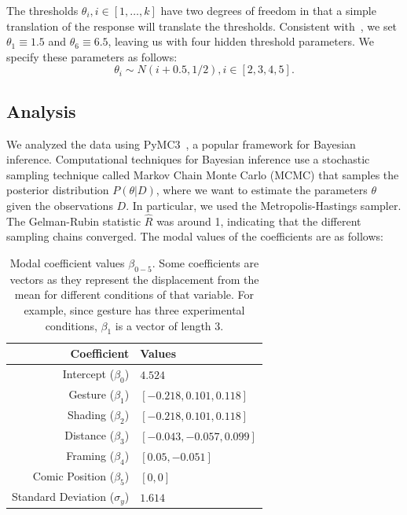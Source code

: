 The thresholds $\theta_i, i \in [1, \ldots, k]$ have two degrees of freedom in that a simple translation of the response will translate the thresholds. Consistent with~\textcite[][p. 674]{Kruschke2014}, we set $\theta_1\equiv1.5$ and $\theta_6\equiv6.5$, leaving us with four hidden threshold parameters. We specify these parameters as follows:
\begin{equation}
 \theta_i \sim N(i+0.5, 1/2), i \in [2, 3, 4, 5].
\end{equation}

\subsection{Analysis}
\label{sub:Analysis}

We analyzed the data using PyMC3~\cite{Salvatier2016}, a popular framework for Bayesian inference. Computational techniques for Bayesian inference use a stochastic sampling technique called Markov Chain Monte Carlo (MCMC) that samples the posterior distribution $P(\theta | D)$, where we want to estimate the parameters $\theta$ given the observations $D$. In particular, we used the Metropolis-Hastings sampler. The Gelman-Rubin statistic $\hat{R}$ was around 1, indicating that the different sampling chains converged. The modal values of the coefficients are as follows:

\begin{table}[htb]%
 \centering
 \caption{Modal coefficient values $\beta_{0-5}$. Some coefficients are vectors as they represent the displacement from the mean for different conditions of that variable. For example, since gesture has three experimental conditions, $\beta_1$ is a vector of length 3.}\label{tab:modal values}
 \begin{tabular}{@{}rl@{}} \toprule
  Coefficient                     & Values                     \\ \midrule
  Intercept ($\beta_0$)           & $4.524$                    \\
  Gesture ($\beta_1$)             & $[-0.218, 0.101, 0.118]$   \\
  Shading ($\beta_2$)             & $ [-0.218 , 0.101, 0.118]$ \\
  Distance ($\beta_3$)            & $[-0.043, -0.057, 0.099]$  \\
  Framing ($\beta_4$)             & $[ 0.05, -0.051]$          \\
  Comic Position ($\beta_5$)      & $[0, 0]$                   \\
  Standard Deviation ($\sigma_y$) & $1.614$                    \\ \bottomrule
 \end{tabular}
\end{table}


